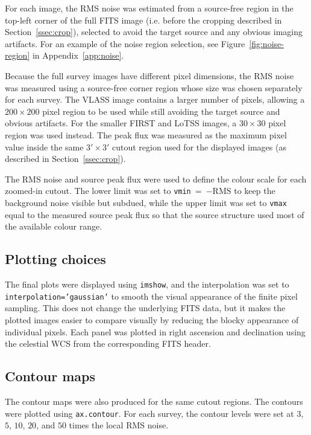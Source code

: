 \documentclass[11pt]{article}
\begin{document}
For each image, the RMS noise was estimated from a source-free region in the top-left corner of the full FITS image (i.e. before the cropping described in Section~\ref{ssec:crop}), selected to avoid the target source and any obvious imaging artifacts. For an example of the noise region selection, see Figure~\ref{fig:noise-region} in Appendix~\ref{app:noise}.

Because the full survey images have different pixel dimensions, the RMS noise was measured using a source-free corner region whose size was chosen separately for each survey. The VLASS image contains a larger number of pixels, allowing a $200 \times 200$ pixel region to be used while still avoiding the target source and obvious artifacts. For the smaller FIRST and LoTSS images, a $30 \times 30$ pixel region was used instead. The peak flux was measured as the maximum pixel value inside the same $3' \times 3'$ cutout region used for the displayed images (as described in Section~\ref{ssec:crop}).

The RMS noise and source peak flux were used to define the colour scale for each zoomed-in cutout. The lower limit was set to \texttt{vmin}~=~$-\mathrm{RMS}$ to keep the background noise visible but subdued, while the upper limit was set to \texttt{vmax} equal to the measured source peak flux so that the source structure used most of the available colour range.

\subsection{Plotting choices}

The final plots were displayed using \texttt{imshow}, and the interpolation was set to \texttt{interpolation='gaussian'} to smooth the visual appearance of the finite pixel sampling. This does not change the underlying FITS data, but it makes the plotted images easier to compare visually by reducing the blocky appearance of individual pixels. Each panel was plotted in right ascension and declination using the celestial
WCS from the corresponding FITS header.

\subsection{Contour maps}

The contour maps were also produced for the same cutout regions. The contours were plotted using \texttt{ax.contour}. For each survey, the contour levels were set at $3$, $5$, $10$, $20$, and $50$ times the local RMS noise.
\end{document}
